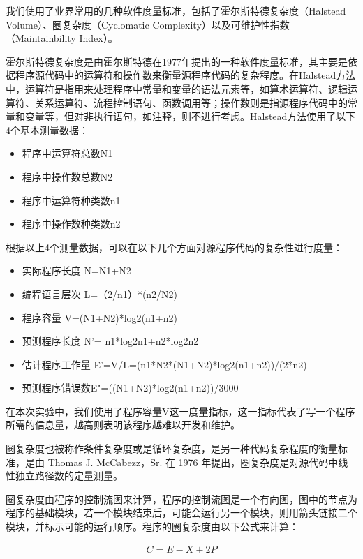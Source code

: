 我们使用了业界常用的几种软件度量标准，包括了霍尔斯特德复杂度（Halstead Volume）、圈复杂度（Cyclomatic Complexity）以及可维护性指数（Maintainbility Index）。

霍尔斯特德复杂度是由霍尔斯特德在1977年提出的一种软件度量标准，其主要是依据程序源代码中的运算符和操作数来衡量源程序代码的复杂程度。在Halstead方法中，运算符是指用来处理程序中常量和变量的语法元素等，如算术运算符、逻辑运算符、关系运算符、流程控制语句、函数调用等；操作数则是指源程序代码中的常量和变量等，但对非执行语句，如注释，则不进行考虑。Halstead方法使用了以下4个基本测量数据：

\begin{itemize}
    \item 程序中运算符总数N1
    \item 程序中操作数总数N2
    \item 程序中运算符种类数n1
    \item 程序中操作数种类数n2
\end{itemize}

根据以上4个测量数据，可以在以下几个方面对源程序代码的复杂性进行度量：

\begin{itemize}
    \item 实际程序长度 N=N1+N2
    \item 编程语言层次 L=（2/n1）*(n2/N2)
    \item 程序容量 V=(N1+N2)*log2(n1+n2) 
    \item 预测程序长度 N'= n1*log2n1+n2*log2n2
    \item 估计程序工作量 E'=V/L=(n1*N2*(N1+N2)*log2(n1+n2))/(2*n2)
    \item 预测程序错误数E"=((N1+N2)*log2(n1+n2))/3000
\end{itemize}

在本次实验中，我们使用了程序容量V这一度量指标，这一指标代表了写一个程序所需的信息量，越高则表明该程序越难以开发和维护。

圈复杂度也被称作条件复杂度或是循环复杂度，是另一种代码复杂程度的衡量标准，是由 Thomas J. McCabezz，Sr. 在 1976 年提出，圈复杂度是对源代码中线性独立路径数的定量测量。

圈复杂度由程序的控制流图来计算，程序的控制流图是一个有向图，图中的节点为程序的基础模块，若一个模块结束后，可能会运行另一个模块，则用箭头链接二个模块，并标示可能的运行顺序。程序的圈复杂度由以下公式来计算：

\begin{align*}
    C = E - X + 2P
\end{align*}

